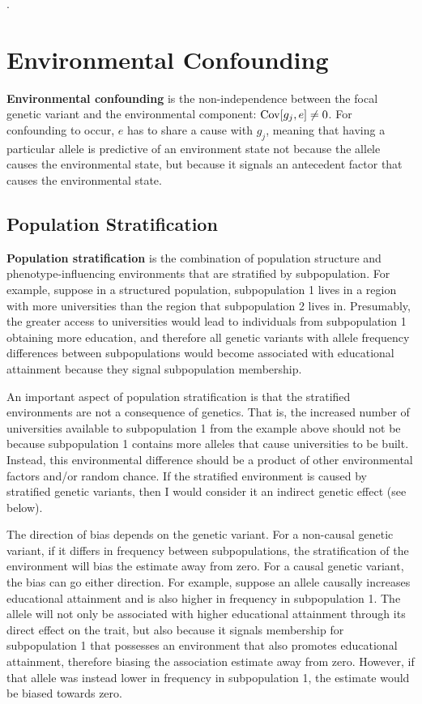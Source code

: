 \documentclass[12pt]{article}
\begin{document}
.

\section{Environmental Confounding}
\textbf{Environmental confounding} is the non-independence between the focal genetic variant and the environmental component: $\mathrm{Cov}[g_j, e] \neq 0$.
For confounding to occur, $e$ has to share a cause with $g_j$, meaning that having a particular allele is predictive of an environment state not because the allele causes the environmental state, but because it signals an antecedent factor that causes the environmental state.

\subsection{Population Stratification}
\textbf{Population stratification} is the combination of population structure and phenotype-influencing environments that are stratified by subpopulation.
For example, suppose in a structured population, subpopulation 1 lives in a region with more universities than the region that subpopulation 2 lives in.
Presumably, the greater access to universities would lead to individuals from subpopulation 1 obtaining more education, and therefore all genetic variants with allele frequency differences between subpopulations would become associated with educational attainment because they signal subpopulation membership.

An important aspect of population stratification  is that the stratified environments are not a consequence of genetics.
That is, the increased number of universities available to subpopulation 1 from the example above should not be because subpopulation 1 contains more alleles that cause universities to be built.
Instead, this environmental difference should be a product of other environmental factors and/or random chance.
If the stratified environment is caused by stratified genetic variants, then I would consider it an indirect genetic effect (see below).

The direction of bias depends on the genetic variant.
For a non-causal genetic variant, if it differs in frequency between subpopulations, the stratification of the environment will bias the estimate away from zero.
For a causal genetic variant, the bias can go either direction.
For example, suppose an allele causally increases educational attainment and is also higher in frequency in subpopulation 1.
The allele will not only be associated with higher educational attainment through its direct effect on the trait, but also because it signals membership for subpopulation 1 that possesses an environment that also promotes educational attainment, therefore biasing the association estimate away from zero.
However, if that allele was instead lower in frequency in subpopulation 1, the estimate would be biased towards zero.
\end{document}
